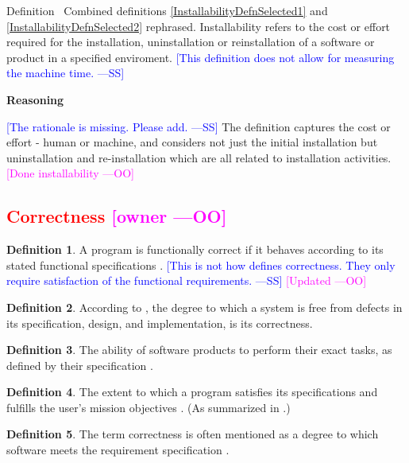 \documentclass[letterpaper,cleveref]{lipics-v2019}
\newcommand{\authornote}[3]{\textcolor{#1}{[#3 ---#2]}}
\newcommand{\authornote}[3]{}
\newcommand{\wss}[1]{\authornote{blue}{SS}{#1}} %
\newcommand{\oo}[1]{\authornote{magenta}{OO}{#1}} %
\newcommand{\notdone}[1]{\textcolor{red}{#1}}
\theoremstyle{definition}
\newtheorem{defn}{Definition}
\begin{document}
Definition~ Combined definitions \ref{InstallabilityDefnSelected1} and
\ref{InstallabilityDefnSelected2} rephrased.
Installability refers to the cost or effort required for the installation,
uninstallation or reinstallation of a software or product in a specified
enviroment.  \wss{This definition does not allow for
	measuring the machine time.}

\noindent \textbf{Reasoning}

\wss{The rationale is missing.  Please add.}
The definition captures the cost or effort - human or machine, and considers not just the initial installation but uninstallation and re-installation which are all related to installation activities.
\oo{Done installability}
\subsection{\notdone{Correctness} \oo{owner}}

\begin{defn}  
	A program is functionally correct if it behaves according to its stated
   functional specifications \citep{GhezziEtAl2003}.  \wss{This is not how
		\citet{GhezziEtAl2003} defines correctness.  They only require satisfaction
		of the functional requirements.} \oo{Updated}
	
\end{defn}

\begin{defn}
	According to \citet{wilson2009quality}, the degree to which a system is free
	from defects in its specification, design, and implementation, is its
	correctness.
\end{defn}

\begin{defn}
	The ability of software products to perform their exact tasks, as defined by
	their specification \citep{meyer1988object}.
\end{defn}

\begin{defn} \label{CorrectnessSelected}
	The extent to which a program satisfies its specifications and fulfills the
	user's mission objectives \citep{McCallEtAl1977}. (As summarized in
	\citet{VanVliet2000}.)
\end{defn}

\begin{defn}
 The term correctness is often mentioned as a degree to which software meets the requirement specification \citep{IEEEStdGlossarySET1990}.
\end{defn}
\end{document}
